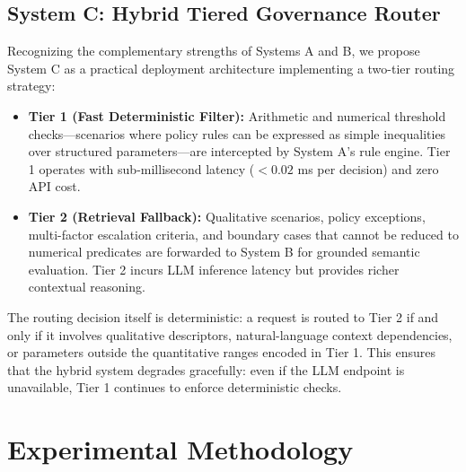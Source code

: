 \documentclass[sigconf,screen]{acmart}
\begin{document}
\subsection{System C: Hybrid Tiered Governance Router}
Recognizing the complementary strengths of Systems A and B, we propose System C as a practical deployment architecture implementing a two-tier routing strategy:
\begin{itemize}[leftmargin=*]
    \item \textbf{Tier 1 (Fast Deterministic Filter):} Arithmetic and numerical threshold checks---scenarios where policy rules can be expressed as simple inequalities over structured parameters---are intercepted by System A's rule engine. Tier 1 operates with sub-millisecond latency ($< 0.02$ ms per decision) and zero API cost.
    \item \textbf{Tier 2 (Retrieval Fallback):} Qualitative scenarios, policy exceptions, multi-factor escalation criteria, and boundary cases that cannot be reduced to numerical predicates are forwarded to System B for grounded semantic evaluation. Tier 2 incurs LLM inference latency but provides richer contextual reasoning.
\end{itemize}
The routing decision itself is deterministic: a request is routed to Tier 2 if and only if it involves qualitative descriptors, natural-language context dependencies, or parameters outside the quantitative ranges encoded in Tier 1. This ensures that the hybrid system degrades gracefully: even if the LLM endpoint is unavailable, Tier 1 continues to enforce deterministic checks.

\section{Experimental Methodology}
\end{document}
